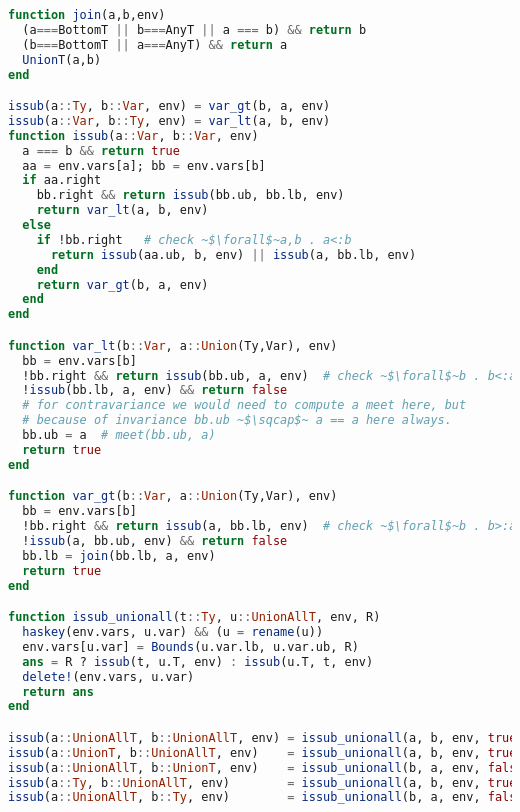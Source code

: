 \begin{singlespace}
\begin{lstlisting}[language=julia]
function join(a,b,env)
  (a===BottomT || b===AnyT || a === b) && return b
  (b===BottomT || a===AnyT) && return a
  UnionT(a,b)
end

issub(a::Ty, b::Var, env) = var_gt(b, a, env)
issub(a::Var, b::Ty, env) = var_lt(a, b, env)
function issub(a::Var, b::Var, env)
  a === b && return true
  aa = env.vars[a]; bb = env.vars[b]
  if aa.right
    bb.right && return issub(bb.ub, bb.lb, env)
    return var_lt(a, b, env)
  else
    if !bb.right   # check ~$\forall$~a,b . a<:b
      return issub(aa.ub, b, env) || issub(a, bb.lb, env)
    end
    return var_gt(b, a, env)
  end
end

function var_lt(b::Var, a::Union(Ty,Var), env)
  bb = env.vars[b]
  !bb.right && return issub(bb.ub, a, env)  # check ~$\forall$~b . b<:a
  !issub(bb.lb, a, env) && return false
  # for contravariance we would need to compute a meet here, but
  # because of invariance bb.ub ~$\sqcap$~ a == a here always.
  bb.ub = a  # meet(bb.ub, a)
  return true
end

function var_gt(b::Var, a::Union(Ty,Var), env)
  bb = env.vars[b]
  !bb.right && return issub(a, bb.lb, env)  # check ~$\forall$~b . b>:a
  !issub(a, bb.ub, env) && return false
  bb.lb = join(bb.lb, a, env)
  return true
end

function issub_unionall(t::Ty, u::UnionAllT, env, R)
  haskey(env.vars, u.var) && (u = rename(u))
  env.vars[u.var] = Bounds(u.var.lb, u.var.ub, R)
  ans = R ? issub(t, u.T, env) : issub(u.T, t, env)
  delete!(env.vars, u.var)
  return ans
end

issub(a::UnionAllT, b::UnionAllT, env) = issub_unionall(a, b, env, true)
issub(a::UnionT, b::UnionAllT, env)    = issub_unionall(a, b, env, true)
issub(a::UnionAllT, b::UnionT, env)    = issub_unionall(b, a, env, false)
issub(a::Ty, b::UnionAllT, env)        = issub_unionall(a, b, env, true)
issub(a::UnionAllT, b::Ty, env)        = issub_unionall(b, a, env, false)

\end{lstlisting}
\end{singlespace}
